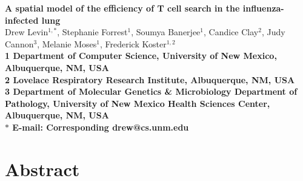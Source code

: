 \documentclass[preprint,10pt,authoryear]{elsarticle}
\date{}
\begin{document}
\begin{flushleft}
{\Large
\textbf{A spatial model of the efficiency of T cell search in the influenza-infected lung}
}
\\
Drew Levin$^{1,\ast}$, 
Stephanie Forrest$^{1}$, 
Soumya Banerjee$^{1}$,
Candice Clay$^{2}$, 
Judy Cannon$^{3}$,
Melanie Moses$^{1}$, 
Frederick Koster$^{1,2}$
\\
\bf{1} Department of Computer Science, University of New Mexico, Albuquerque, NM, USA
\\
\bf{2} Lovelace Respiratory Research Institute, Albuquerque, NM, USA
\\
\bf{3} Department of Molecular Genetics \& Microbiology Department of Pathology, University of New Mexico Health Sciences Center, Albuquerque, NM, USA
\\
$\ast$ E-mail: Corresponding drew@cs.unm.edu
\end{flushleft}



\section*{Abstract}


\end{document}
